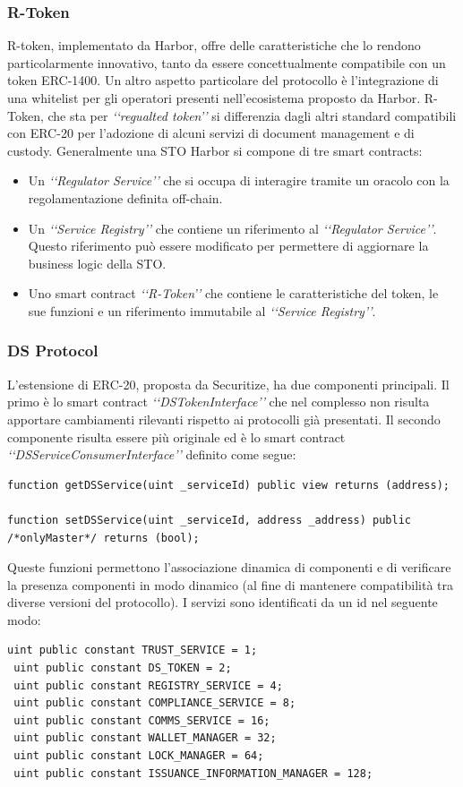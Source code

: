 \subsubsection{R-Token}
R-token, implementato da Harbor, offre delle caratteristiche che lo rendono particolarmente innovativo, tanto da essere concettualmente compatibile con un token ERC-1400. Un altro aspetto particolare del protocollo è l'integrazione di una whitelist per gli operatori presenti nell'ecosistema proposto da Harbor. 
R-Token, che sta per \textit{‘‘regualted token’’} si differenzia dagli altri standard compatibili con ERC-20 per l'adozione di alcuni servizi di document management e di custody. 
Generalmente una STO Harbor si compone di tre smart contracts:
\begin{itemize}
    \item Un \textit{‘‘Regulator Service’’} che si occupa di interagire tramite un oracolo con la regolamentazione definita off-chain. 
    \item Un \textit{‘‘Service Registry’’} che contiene un riferimento al \textit{‘‘Regulator Service’’}. Questo riferimento può essere modificato per permettere di aggiornare la business logic della STO. 
    \item Uno smart contract \textit{‘‘R-Token’’} che contiene le caratteristiche del token, le sue funzioni e un riferimento immutabile al \textit{‘‘Service Registry’’}.
\end{itemize}
\subsubsection{DS Protocol}
L'estensione di ERC-20, proposta da Securitize, ha due componenti principali. Il primo è lo smart contract \textit{‘‘DSTokenInterface’’} che nel complesso non risulta apportare cambiamenti rilevanti rispetto ai protocolli già presentati. Il secondo componente risulta essere più originale ed è lo smart contract \textit{‘‘DSServiceConsumerInterface’’} definito come segue:
\begin{lstlisting}[language=Solidity,numbers=none]
function getDSService(uint _serviceId) public view returns (address);

function setDSService(uint _serviceId, address _address) public /*onlyMaster*/ returns (bool);
\end{lstlisting}
Queste funzioni permettono l'associazione dinamica di componenti e di verificare la presenza componenti  in modo dinamico (al fine di mantenere compatibilità tra diverse versioni del protocollo). I servizi sono identificati da un id nel seguente modo:
\begin{lstlisting}[language=Solidity,numbers=none]
 uint public constant TRUST_SERVICE = 1;
 uint public constant DS_TOKEN = 2;
 uint public constant REGISTRY_SERVICE = 4;
 uint public constant COMPLIANCE_SERVICE = 8;
 uint public constant COMMS_SERVICE = 16;
 uint public constant WALLET_MANAGER = 32;
 uint public constant LOCK_MANAGER = 64;
 uint public constant ISSUANCE_INFORMATION_MANAGER = 128;
 \end{lstlisting}
